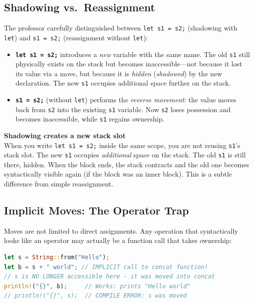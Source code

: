 \subsection{Shadowing vs.\ Reassignment}

The professor carefully distinguished between \texttt{let s1 = s2;} (shadowing with \texttt{let}) and \texttt{s1 = s2;} (reassignment without \texttt{let}):

\begin{itemize}
    \item \textbf{\texttt{let s1 = s2;}} introduces a \emph{new} variable with the same name. The old \texttt{s1} still physically exists on the stack but becomes inaccessible---not because it lost its value via a move, but because it is \emph{hidden} (\emph{shadowed}) by the new declaration. The new \texttt{s1} occupies additional space further on the stack.
    \item \textbf{\texttt{s1 = s2;}} (without \texttt{let}) performs the \emph{reverse movement}: the value moves back from \texttt{s2} into the existing \texttt{s1} variable. Now \texttt{s2} loses possession and becomes inaccessible, while \texttt{s1} regains ownership.
\end{itemize}

\begin{warningbox}
\textbf{Shadowing creates a new stack slot} \\
When you write \texttt{let s1 = s2;} inside the same scope, you are not reusing \texttt{s1}'s stack slot. The new \texttt{s1} occupies \emph{additional} space on the stack. The old \texttt{s1} is still there, hidden. When the block ends, the stack contracts and the old one becomes syntactically visible again (if the block was an inner block). This is a subtle difference from simple reassignment.
\end{warningbox}

\subsection{Implicit Moves: The Operator Trap}

Moves are not limited to direct assignments. Any operation that syntactically looks like an operator may actually be a function call that takes ownership:

\begin{lstlisting}[language=Rust]
let s = String::from("Hello");
let b = s + " world"; // IMPLICIT call to concat function!
// s is NO LONGER accessible here - it was moved into concat
println!("{}", b);     // Works: prints "Hello world"
// println!("{}", s);  // COMPILE ERROR: s was moved
\end{lstlisting}

